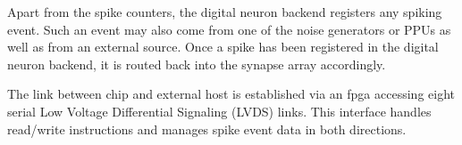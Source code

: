 Apart from the spike counters, the digital neuron backend registers any spiking event. Such an event may also come from one of the noise generators or PPUs as well as from an external source. Once a spike has been registered in the digital neuron backend, it is routed back into the synapse array accordingly. 

The link between chip and external host is established via an \gls{fpga} accessing eight serial Low Voltage Differential Signaling (LVDS) links. This interface handles read/write instructions and manages spike event data in both directions. %